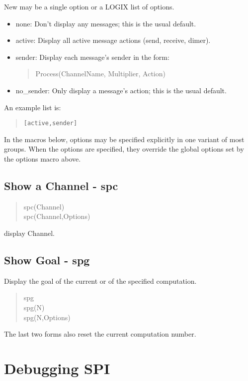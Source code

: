 \noindent
New  may be a single option or a LOGIX list of options.

\begin{itemize}
\item none:     Don't display any messages; this is the usual default.
\item active:   Display all active message actions (send, receive, dimer).
\item sender:   Display each message's sender in the form:
\begin{verse}
Process(ChannelName, Multiplier, Action)
\end{verse}
\item no\_sender: Only display a message's action; this is the usual default.
\end{itemize}

\noindent
An example list is:

\begin{verse}
    \verb+[active,sender]+
\end{verse}

\noindent
In the macros below, options may be specified explicitly in one variant
of most groups.  When the options are specified, they override the
global options set by the options macro above.

\subsection{Show a Channel - spc}

\begin{verse}
    spc(Channel) \\
    spc(Channel,Options)
\end{verse}

\noindent
display Channel.

\subsection{Show Goal - spg}

Display the goal of the current or of the specified computation.

\begin{verse}
   spg \\
   spg(N) \\
   spg(N,Options)
\end{verse}

\noindent
The last two forms also reset the current computation number.

\section{Debugging SPI}

